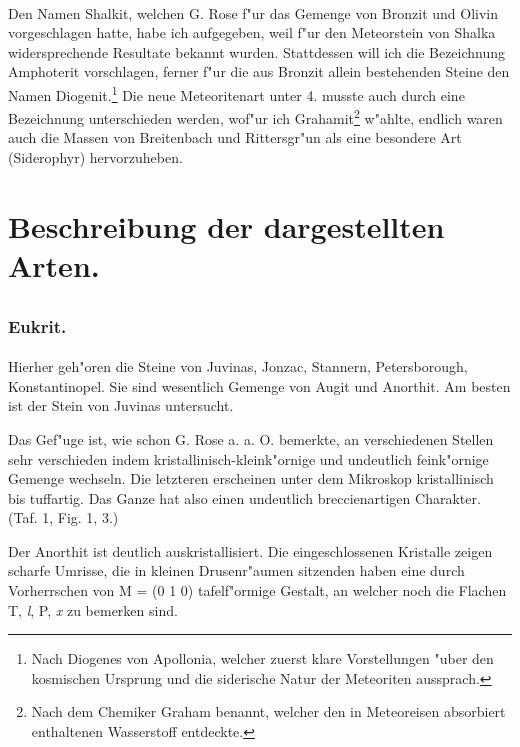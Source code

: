 \documentclass[a4paper, 11pt, oneside, polutonikogreek, german]{article}
\begin{document}
\paragraph*{}
Den Namen Shalkit, welchen G. Rose f"ur das Gemenge von Bronzit und Olivin vorgeschlagen hatte, habe ich aufgegeben, weil f"ur den Meteorstein von Shalka widersprechende Resultate bekannt wurden. Stattdessen will ich die Bezeichnung Amphoterit vorschlagen, ferner f"ur die aus Bronzit allein bestehenden Steine den Namen Diogenit.\footnote{Nach Diogenes von Apollonia, welcher zuerst klare Vorstellungen "uber den kosmischen Ursprung und die siderische Natur der Meteoriten aussprach.} Die neue Meteoritenart unter 4. musste auch durch eine Bezeichnung unterschieden werden, wof"ur ich Grahamit\footnote{Nach dem Chemiker Graham benannt, welcher den in Meteoreisen absorbiert enthaltenen Wasserstoff entdeckte.} w"ahlte, endlich waren auch die Massen von Breitenbach und Rittersgr"un als eine besondere Art (Siderophyr) hervorzuheben.
\clearpage
\section{Beschreibung der dargestellten Arten.}
\subsection{}
\subsubsection{Eukrit.}
\paragraph{}
Hierher geh"oren die Steine von Juvinas, Jonzac, Stannern, Petersborough, Konstantinopel. Sie sind wesentlich Gemenge von Augit und Anorthit. Am besten ist der Stein von Juvinas untersucht.

Das Gef"uge ist, wie schon G. Rose a. a. O. bemerkte, an verschiedenen Stellen sehr verschieden indem kristallinisch-kleink"ornige und undeutlich feink"ornige Gemenge wechseln. Die letzteren erscheinen unter dem Mikroskop kristallinisch bis tuffartig. Das Ganze hat also einen undeutlich breccienartigen Charakter. (Taf. 1, Fig. 1, 3.)

Der Anorthit ist deutlich auskristallisiert. Die eingeschlossenen Kristalle zeigen scharfe Umrisse, die in kleinen Drusenr"aumen sitzenden haben eine durch Vorherrschen von M = (0 1 0) tafelf"ormige Gestalt, an welcher noch die Flachen T, \emph{l}, P, \emph{x} zu bemerken sind.
\end{document}
